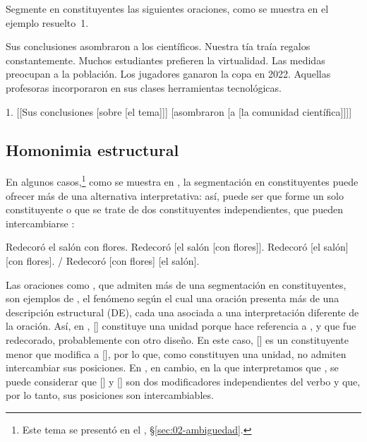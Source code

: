 \begin{ejercicio}\label{ej:05-segmentar}
Segmente en constituyentes las siguientes oraciones, como se muestra en el
ejemplo resuelto~1.

\begin{exe}
  \ex Sus conclusiones asombraron a los científicos.
  \ex Nuestra tía traía regalos constantemente.
  \ex Muchos estudiantes prefieren la virtualidad.
  \ex Las medidas preocupan a la población.
  \ex Los jugadores ganaron la copa en 2022.
  \ex Aquellas profesoras incorporaron en sus clases herramientas tecnológicas.
\end{exe}

\begin{resuelto}
1. [[Sus conclusiones [sobre [el tema]]] [asombraron [a [la comunidad
científica]]]]
\end{resuelto}
\end{ejercicio}

\subsection{Homonimia estructural}\label{sec:05-homonimia}

En algunos casos,\footnote{Este tema se presentó en el ,
§\ref{sec:02-ambiguedad}.} como se muestra en , la
segmentación en constituyentes puede ofrecer más de una alternativa
interpretativa: así, puede ser que  forme un solo
constituyente  o que se trate de dos constituyentes
independientes, que pueden intercambiarse :

\begin{exe}
  \ex\label{ex:05-salon}
    \begin{xlist}
      \ex Redecoró el salón con flores.
      \ex\label{ex:05-salon-b} Redecoró [el salón [con flores]].
      \ex\label{ex:05-salon-c} Redecoró [el salón] [con flores]. / Redecoró [con
          flores] [el salón].
    \end{xlist}
\end{exe}

Las oraciones como , que admiten más de una segmentación en
constituyentes, son ejemplos de , el fenómeno
según el cual una oración presenta más de una descripción estructural (DE), cada
una asociada a una interpretación diferente de la oración. Así, en
, [] constituye una unidad porque
hace referencia a , y que fue redecorado, probablemente con otro diseño. En este caso,
[] es un constituyente menor que modifica a [],
por lo que, como constituyen una unidad, no admiten intercambiar sus posiciones.
En , en cambio, en la que interpretamos que , se puede considerar que [] y []
son dos modificadores independientes del verbo  y que, por lo
tanto, sus posiciones son intercambiables.

